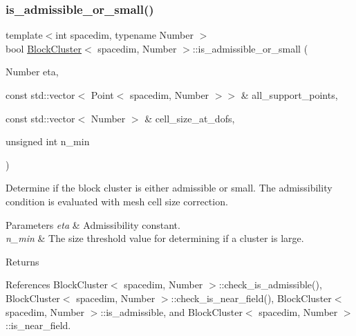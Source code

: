 \mbox{\label{classBlockCluster_a620554d7d66beaf4dc38f166bc6dceed}} 
\subsubsection{\texorpdfstring{is\+\_\+admissible\+\_\+or\+\_\+small()}{is\_admissible\_or\_small()}\hspace{0.1cm}{\footnotesize\ttfamily [2/2]}}
{\footnotesize\ttfamily template$<$int spacedim, typename Number $>$ \\
bool \hyperlink{classBlockCluster}{Block\+Cluster}$<$ spacedim, Number $>$\+::is\+\_\+admissible\+\_\+or\+\_\+small (\begin{DoxyParamCaption}\item[{Number}]{eta,  }\item[{const std\+::vector$<$ Point$<$ spacedim, Number $>$$>$ \&}]{all\+\_\+support\+\_\+points,  }\item[{const std\+::vector$<$ Number $>$ \&}]{cell\+\_\+size\+\_\+at\+\_\+dofs,  }\item[{unsigned int}]{n\+\_\+min }\end{DoxyParamCaption})}

Determine if the block cluster is either admissible or small. The admissibility condition is evaluated with mesh cell size correction.


\begin{DoxyParams}{Parameters}
{\em eta} & Admissibility constant. \\
\hline
{\em n\+\_\+min} & The size threshold value for determining if a cluster is large. \\
\hline
\end{DoxyParams}
\begin{DoxyReturn}{Returns}

\end{DoxyReturn}


References Block\+Cluster$<$ spacedim, Number $>$\+::check\+\_\+is\+\_\+admissible(), Block\+Cluster$<$ spacedim, Number $>$\+::check\+\_\+is\+\_\+near\+\_\+field(), Block\+Cluster$<$ spacedim, Number $>$\+::is\+\_\+admissible, and Block\+Cluster$<$ spacedim, Number $>$\+::is\+\_\+near\+\_\+field.

\mbox{\label{classBlockCluster_a9963a6320591f82824398667bcb9cdf8}} 
